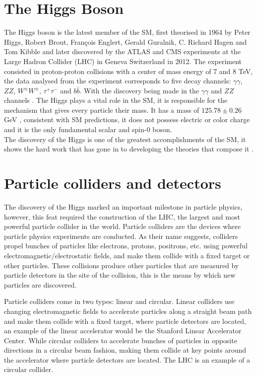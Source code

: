 \section{The Higgs Boson }
The Higgs boson is the latest member of the SM, first theorised in 1964 by Peter Higgs, Robert Brout, François Englert, Gerald Guralnik, C. Richard Hagen and Tom Kibble and later discovered by the ATLAS and CMS experiments at the Large Hadron Collider (LHC) in Geneva Switzerland in 2012. The experiment consisted in proton-proton collisions with a center of mass energy of 7 and 8 TeV, the data analysed from the experiment corresponds to five decay channels: $\gamma\gamma$, $ZZ$, $W^{\pm}W^{\pm}$, $\tau^+\tau^-$ and $b\bar{b}$. With the discovery being made in the  $\gamma\gamma$ and $ZZ$ channels
\cite{higgsd}\cite{Aad_2012}.
The Higgs plays a vital role in the SM, it is responsible for the mechanism that gives every particle their mass. It has a mass of $125.78\pm 0.26$ GeV \cite{CMS:2019drq}, consistent with SM predictions, it does not possess electric or color charge and it is the only fundamental scalar and spin-0 boson.\\
 The discovery of the Higgs is one of the greatest accomplishments of the SM, it shows the hard work that has gone in to developing the theories that compose it \cite{Thomson:2013zua}.


\section{Particle colliders and
detectors}
The discovery of the Higgs marked an important milestone in particle physics, however, this feat required the construction of the LHC, the largest and most powerful particle collider in the world. Particle colliders are the devices where particle physics experiments are conducted. As their name suggests, colliders propel bunches of particles like electrons, protons, positrons, etc. using powerful electromagnetic/electrostatic fields, and make them collide with a fixed target or other particles. These collisions produce other particles that are measured by particle detectors in the site of the collision, this is the means by which new particles are discovered.

Particle colliders come in two types: linear  and circular. Linear colliders  use changing electromagnetic fields to accelerate particles along a straight beam path and make them collide with a fixed target, where particle detectors are located, an example of the linear accelerator would be the Stanford Linear Accelerator Center. While circular colliders to accelerate bunches of particles  in opposite directions in a circular beam fashion, making them collide at key points around the accelerator where particle detectors are located.  The LHC is an example of a circular collider.

